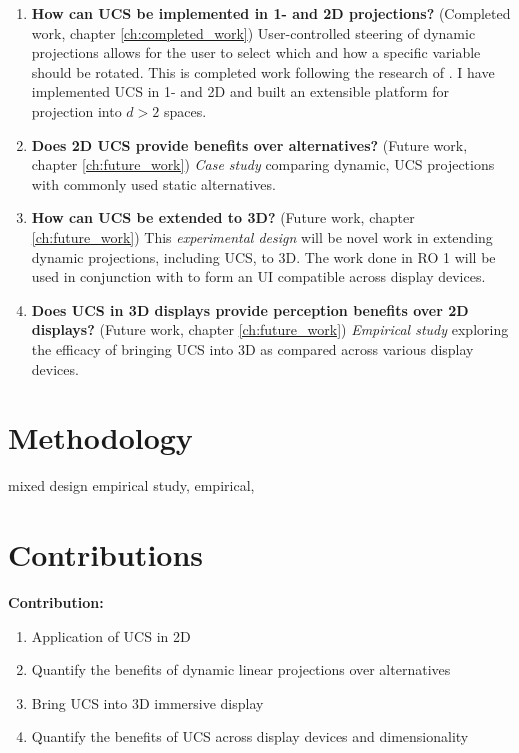 \documentclass{monashthesis}
\begin{document}
\begin{enumerate}
\def\labelenumi{\arabic{enumi}.}
\tightlist
\item
  \textbf{How can UCS be implemented in 1- and 2D projections?}
  (Completed work, chapter \ref{ch:completed_work}) User-controlled
  steering of dynamic projections allows for the user to select which
  and how a specific variable should be rotated. This is completed work
  following the research of \textcite{cook_manual_1997}. I have
  implemented UCS in 1- and 2D and built an extensible platform for
  projection into \(d>2\) spaces.
\item
  \textbf{Does 2D UCS provide benefits over alternatives?} (Future work,
  chapter \ref{ch:future_work}) \emph{Case study} comparing dynamic, UCS
  projections with commonly used static alternatives.
\item
  \textbf{How can UCS be extended to 3D?} (Future work, chapter
  \ref{ch:future_work}) This \emph{experimental design} will be novel
  work in extending dynamic projections, including UCS, to 3D. The work
  done in RO 1 will be used in conjunction with
  \textcite{cordeil_immersive_2019} to form an UI compatible across
  display devices.
\item
  \textbf{Does UCS in 3D displays provide perception benefits over 2D
  displays?} (Future work, chapter \ref{ch:future_work}) \emph{Empirical
  study} exploring the efficacy of bringing UCS into 3D as compared
  across various display devices.
\end{enumerate}

\section{Methodology}\label{methodology}

mixed design empirical study, empirical,

\section{Contributions}\label{contributions}

\textbf{Contribution:}

\begin{enumerate}
\def\labelenumi{\arabic{enumi}.}
\tightlist
\item
  Application of UCS in 2D
\item
  Quantify the benefits of dynamic linear projections over alternatives
\item
  Bring UCS into 3D immersive display
\item
  Quantify the benefits of UCS across display devices and dimensionality
\end{enumerate}
\end{document}
